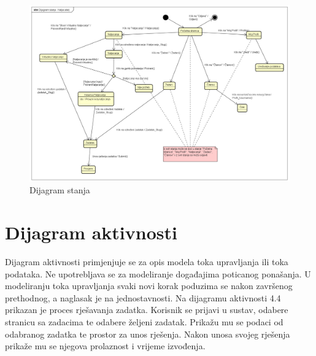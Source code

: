 			\begin{figure}[H]
				\includegraphics[width=\textwidth]{slike/DijagramStanja.png} %
				\caption{Dijagram stanja}
				\label{fig:DijagramStanja} %
			\end{figure}
			
			
			\eject 
		
		\section{Dijagram aktivnosti}
			
			Dijagram aktivnosti primjenjuje se za opis modela toka upravljanja ili toka podataka. Ne upotrebljava se za modeliranje događajima poticanog ponašanja. U modeliranju toka upravljanja svaki novi korak poduzima se nakon završenog prethodnog, a naglasak je na jednostavnosti. Na dijagramu aktivnosti 4.4 prikazan je proces rješavanja zadatka. Korisnik se prijavi u sustav, odabere stranicu sa zadacima te odabere željeni zadatak. Prikažu mu se podaci od odabranog zadatka te prostor za unos rješenja. Nakon unosa svojeg rješenja prikaže mu se njegova prolaznost i vrijeme izvođenja.
			
